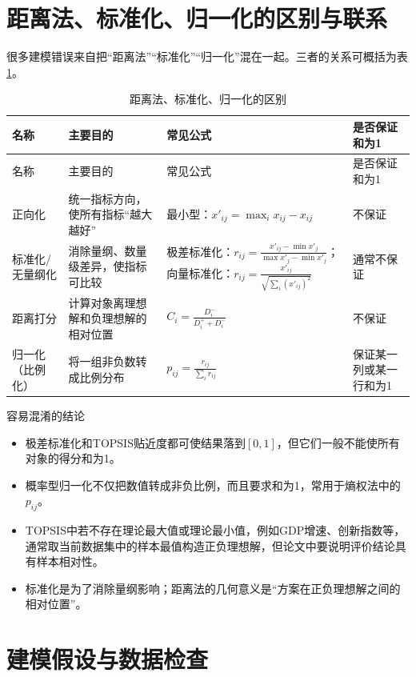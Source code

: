 \documentclass[UTF8,a4paper,12pt,fontset=none]{ctexart}
\begin{document}
\section{距离法、标准化、归一化的区别与联系}

很多建模错误来自把“距离法”“标准化”“归一化”混在一起。三者的关系可概括为表\ref{tab:diff}。

\begin{longtable}{p{2.6cm}p{4.3cm}p{4.2cm}p{3.5cm}}
\caption{距离法、标准化、归一化的区别}\label{tab:diff}\\
\toprule
名称 & 主要目的 & 常见公式 & 是否保证和为1\\
\midrule
\endfirsthead
\toprule
名称 & 主要目的 & 常见公式 & 是否保证和为1\\
\midrule
\endhead
正向化 & 统一指标方向，使所有指标“越大越好” & 最小型：$x'_{ij}=\max_i x_{ij}-x_{ij}$ & 不保证\\
标准化/无量纲化 & 消除量纲、数量级差异，使指标可比较 & 极差标准化：$r_{ij}=\frac{x'_{ij}-\min x'_j}{\max x'_j-\min x'_j}$；向量标准化：$r_{ij}=\frac{x'_{ij}}{\sqrt{\sum_i (x'_{ij})^2}}$ & 通常不保证\\
距离打分 & 计算对象离理想解和负理想解的相对位置 & $C_i=\frac{D_i^-}{D_i^++D_i^-}$ & 不保证\\
归一化（比例化） & 将一组非负数转成比例分布 & $p_{ij}=\frac{r_{ij}}{\sum_i r_{ij}}$ & 保证某一列或某一行和为1\\
\bottomrule
\end{longtable}

\begin{keybox}{容易混淆的结论}
\begin{itemize}[leftmargin=2em]
  \item 极差标准化和TOPSIS贴近度都可使结果落到$[0,1]$，但它们一般不能使所有对象的得分和为1。
  \item 概率型归一化不仅把数值转成非负比例，而且要求和为1，常用于熵权法中的$p_{ij}$。
  \item TOPSIS中若不存在理论最大值或理论最小值，例如GDP增速、创新指数等，通常取当前数据集中的样本最值构造正负理想解，但论文中要说明评价结论具有样本相对性。
  \item 标准化是为了消除量纲影响；距离法的几何意义是“方案在正负理想解之间的相对位置”。
\end{itemize}
\end{keybox}

\section{建模假设与数据检查}
\end{document}
